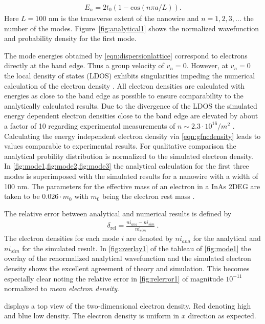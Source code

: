 \begin{align}
E_{n} = 2t_0(1-\text{cos}(n\pi a/L)).
\label{eqn:dispersionlattice}
\end{align}
Here $L=100$ nm is the transverse extent of the nanowire and $n=1,2,3,\dotsc$ the number of the modes. Figure~\ref{fig:analytical1} shows the normalized wavefunction and probability density for the first mode.\par
The mode energies obtained by \cref{eqn:dispersionlattice} correspond to electrons directly at the band edge. Thus a group velocity of $v_n=0$. However, at $v_n=0$ the local density of states (LDOS) exhibits singularities \cite{ghasemi:69010R} impeding the numerical calculation of the electron density \cite{Wimmer2009Thesis}.
All electron densities are calculated with energies as close to the band edge as possible to ensure comparability to the analytically calculated results. Due to the divergence of the LDOS the simulated energy dependent electron densities close to the band edge are elevated by about a factor of 10 regarding experimental measurements of $n \sim2.3\cdot 10^{16}/m^2$ \cite{gelfand2006} \cite{JJAP.26.L59}. Calculating the energy independent electron density via \cref{eqn:gfncdensity} leads to values comparable to experimental results. For qualitative comparison the analytical probility distribution is normalized to the simulated electron density.
In \cref{fig:mode1,fig:mode2,fig:mode3} the analytical calculation for the first three modes is superimposed with the simulated results for a nanowire with a width of 100 nm. 
The parameters for the effective mass of an electron in a InAs 2DEG are taken to be $0.026\cdot m_0$ with $m_0$ being the electron rest mass \cite{PhysRev.105.460}.\par
The relative error between analytical and numerical results is defined by
\begin{align}
\delta_{\text{rel}} = \frac{ni_{ana}-ni_{sim}}{ni_{sim}}\ .
\end{align}
The electron densities for each mode $i$ are denoted by $ni_{ana}$ for the analytical and $ni_{sim}$ for the simulated result.
In \cref{fig:overlay1} of the tableau of \cref{fig:mode1} the overlay of the renormalized analytical wavefunction and the simulated electron density shows the excellent agreement of theory and simulation. This becomes especially clear noting the relative error in \cref{fig:relerror1} of magnitude $10^{-11}$ normalized to \emph{mean electron density}.\par
{} displays a top view of the two-dimensional electron density. Red denoting high and blue low density. The electron density is uniform in $x$ direction as expected.\par
